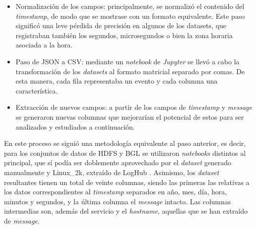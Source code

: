 \begin{itemize}
    \item Normalización de los campos: principalmente, se normalizó el contenido del \textit{timestamp}, de modo que se mostrase con un formato equivalente. Este paso significó una leve pérdida de precisión en algunos de los datasets, que registraban también los segundos, microsegundos o bien la zona horaria asociada a la hora.
    \item Paso de \gls{JSON} a \gls{CSV}: mediante un \textit{notebook} de \textit{Jupyter} se llevó a cabo la transformación de los \textit{datasets} al formato matricial separado por comas. De esta manera, cada fila representaba un evento y cada columna una característica.
    \item Extracción de nuevos campos: a partir de los campos de \textit{timestamp} y \textit{message} se generaron nuevas columnas que mejorarían el potencial de estos para ser analizados y estudiados a continuación.
\end{itemize}

En este proceso se siguió una metodología equivalente al paso anterior, es decir, para los conjuntos de datos de \gls{HDFS} y \gls{BGL} se utilizaron \textit{notebooks} distintos al principal, que sí podía ser doblemente aprovechado por el \textit{dataset} generado manualmente y Linux\_2k, extraído de LogHub \cite{loghub2023}. Asimismo, los \textit{dataset} resultantes tienen un total de veinte columnas, siendo las primeras las relativas a los datos correspondientes al \textit{timestamp} separados en año, mes, día, hora, minutos y segundos, y la última columna el \textit{message} intacto. Las columnas intermedias son, además del servicio y el \textit{hostname}, aquellas que se han extraído de \textit{message}.



